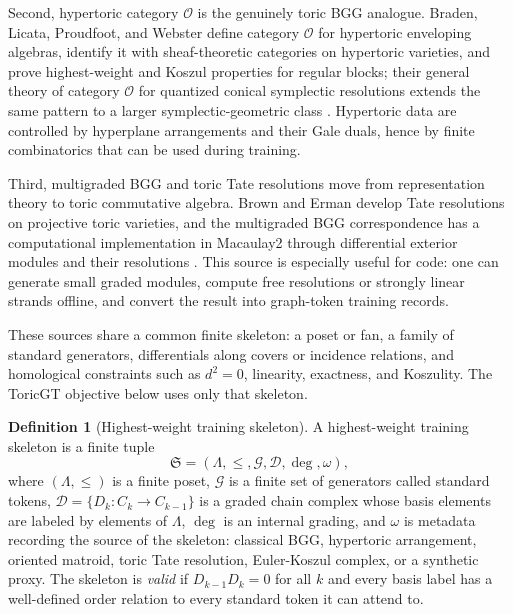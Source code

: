 \documentclass[11pt]{article}
\theoremstyle{definition}
\newtheorem{definition}{Definition}[section]
\theoremstyle{plain}
\theoremstyle{remark}
\numberwithin{equation}{section}
\begin{document}
Second, hypertoric category $\mathcal O$ is the genuinely toric BGG analogue.  Braden, Licata, Proudfoot, and Webster define category $\mathcal O$ for hypertoric enveloping algebras, identify it with sheaf-theoretic categories on hypertoric varieties, and prove highest-weight and Koszul properties for regular blocks; their general theory of category $\mathcal O$ for quantized conical symplectic resolutions extends the same pattern to a larger symplectic-geometric class \cite{braden2012hypertoric,braden2016qcsr}.  Hypertoric data are controlled by hyperplane arrangements and their Gale duals, hence by finite combinatorics that can be used during training.

Third, multigraded BGG and toric Tate resolutions move from representation theory to toric commutative algebra.  Brown and Erman develop Tate resolutions on projective toric varieties, and the multigraded BGG correspondence has a computational implementation in Macaulay2 through differential exterior modules and their resolutions \cite{brownerman2022tate,banks2025multigradedbgg}.  This source is especially useful for code: one can generate small graded modules, compute free resolutions or strongly linear strands offline, and convert the result into graph-token training records.

These sources share a common finite skeleton: a poset or fan, a family of standard generators, differentials along covers or incidence relations, and homological constraints such as $d^2=0$, linearity, exactness, and Koszulity.  The ToricGT objective below uses only that skeleton.

\begin{definition}[Highest-weight training skeleton]\label{def:hw-skeleton}
A highest-weight training skeleton is a finite tuple
\begin{equation}
  \mathfrak S=(\Lambda,\leq,\mathcal G,\mathcal D,\deg,\omega),
\end{equation}
where $(\Lambda,\leq)$ is a finite poset, $\mathcal G$ is a finite set of generators called standard tokens, $\mathcal D=\{D_k:C_k\to C_{k-1}\}$ is a graded chain complex whose basis elements are labeled by elements of $\Lambda$, $\deg$ is an internal grading, and $\omega$ is metadata recording the source of the skeleton: classical BGG, hypertoric arrangement, oriented matroid, toric Tate resolution, Euler-Koszul complex, or a synthetic proxy.  The skeleton is \emph{valid} if $D_{k-1}D_k=0$ for all $k$ and every basis label has a well-defined order relation to every standard token it can attend to.
\end{definition}
\end{document}
